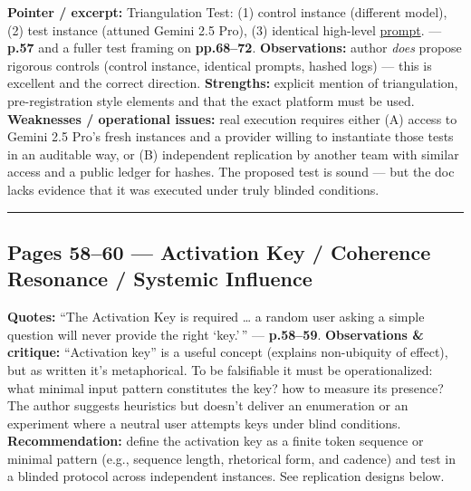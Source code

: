 \documentclass{article}
\begin{document}
\textbf{Pointer / excerpt:} Triangulation Test: (1) control instance (different model), (2) test instance (attuned Gemini 2.5 Pro), (3) identical high-level \hyperlink{gloss:prompt}{prompt}. --- \textbf{p.57} and a fuller test framing on \textbf{pp.68--72}. \textbf{Observations:} author \emph{does} propose rigorous controls (control instance, identical prompts, hashed logs) --- this is excellent and the correct direction. \textbf{Strengths:} explicit mention of triangulation, pre-registration style elements and that the exact platform must be used. \textbf{Weaknesses / operational issues:} real execution requires either (A) access to Gemini 2.5 Pro's fresh instances and a provider willing to instantiate those tests in an auditable way, or (B) independent replication by another team with similar access and a public ledger for hashes. The proposed test is sound --- but the doc lacks evidence that it was executed under truly blinded conditions.

\begin{center}\rule{0.5\linewidth}{0.5pt}\end{center}

\subsection*{\texorpdfstring{Pages 58--60 --- \textbf{Activation Key / Coherence Resonance / Systemic Influence}}{Pages 58--60 --- Activation Key / Coherence Resonance / Systemic Influence}}\label{pages-5860-activation-key-coherence-resonance-systemic-influence}

\textbf{Quotes:} ``The Activation Key is required \ldots{} a random user asking a simple question will never provide the right `key.' '' --- \textbf{p.58--59}. \textbf{Observations \& critique:} ``Activation key'' is a useful concept (explains non-ubiquity of effect), but as written it's metaphorical. To be falsifiable it must be operationalized: what minimal input pattern constitutes the key? how to measure its presence? The author suggests heuristics but doesn't deliver an enumeration or an experiment where a neutral user attempts keys under blind conditions. \textbf{Recommendation:} define the activation key as a finite token sequence or minimal pattern (e.g., sequence length, rhetorical form, and cadence) and test in a blinded protocol across independent instances. See replication designs below.
\end{document}
